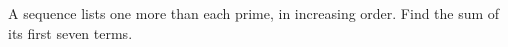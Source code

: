 A sequence lists one more than each prime, in increasing order. Find the sum of its first seven terms.
